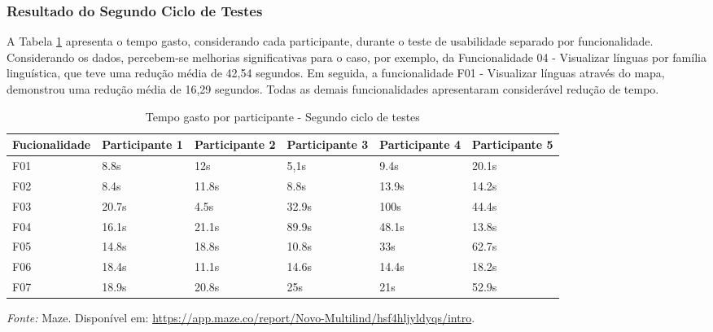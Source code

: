 \subsubsection{Resultado do Segundo Ciclo de Testes}
\label{sec:Resultado do Segundo Ciclo de Testes}
A Tabela \ref{tab07} apresenta o tempo gasto, considerando cada participante, durante o teste de usabilidade separado por funcionalidade. Considerando os dados, percebem-se melhorias significativas para o caso, por exemplo, da Funcionalidade 04 - Visualizar línguas 
por família linguística, que teve uma redução média de 42,54 segundos. Em seguida, a funcionalidade F01 - Visualizar línguas através do mapa, demonstrou uma redução média de 16,29 segundos. Todas as demais funcionalidades apresentaram considerável redução de 
tempo. 

\begin{table}[h!]
	\centering
	\caption{Tempo gasto por participante - Segundo ciclo de testes}
	\label{tab07}
	\begin{adjustbox}{center}
	\begin{tabular}{l|l|l|l|l|l}
	\hline
	Fucionalidade & Participante 1 & Participante 2 & Participante 3 & Participante 4 & Participante 5 \\ 	\hline
	F01                   & 8.8s     & 12s     & 5,1s      & 9.4s       & 20.1s      \\
	F02                   & 8.4s        & 11.8s      & 8.8s      & 13.9s    & 14.2s     \\
	F03                   & 20.7s        & 4.5s      & 32.9s      & 100s     & 44.4s     \\
	F04                   & 16.1s        & 21.1s     & 89.9s     & 48.1s     & 13.8s     \\
	F05                   & 14.8s      & 18.8s      & 10.8s     & 33s     & 62.7s     \\
	F06                   & 18.4s     & 11.1s      & 14.6s     & 14.4s     & 18.2s     \\
	F07                   & 18.9s     & 20.8s      & 25s     & 21s    & 52.9s       \\ 	\hline
	\end{tabular}
	\end{adjustbox}
	\begin{tablenotes}[flushleft]
		\centering
		\item \textit{Fonte:} Maze. Disponível em: \url{https://app.maze.co/report/Novo-Multilind/hsf4hljyldyqs/intro}.
	  \end{tablenotes}
\end{table}


